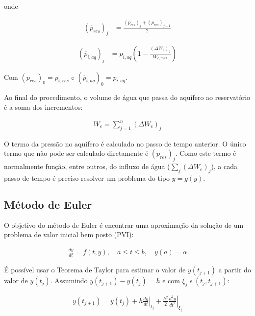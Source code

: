 \documentclass[final,5p]{elsarticle}
\numberwithin{equation}{section}
\begin{document}
        \noindent
        onde

        \begin{align}
            (\overline{p}_{res})_j &= \frac{(p_{res})_j + (p_{res})_{j-1}}{2} \label{eq:presmedio}
        \end{align}

        \begin{align}
            (\overline{p}_{i,aq})_j &= p_{i,aq} \left( 1 - \frac{(\Delta W_e)_j}{W_{e,max}} \right) \label{eq:paqmedio}
        \end{align}

        Com $(p_{res})_0 = p_{i,res}$ e $(\overline{p}_{i,aq})_0 = p_{i,aq}$.

        Ao final do procedimento, o volume de água que passa do aquífero ao reservatório é a soma dos incrementos:

        \begin{align}
            W_e = \sum_{j = 1}^{n}  (\Delta W_e)_j \label{eq:wetotal}
        \end{align}

        O termo da pressão no aquífero é calculado no passo de tempo anterior. O único termo que não pode ser calculado diretamente é $(p_{res})_j$. Como este termo é normalmente função, entre outros, do influxo de água ($\sum_{j} (\Delta W_e)_j$), a cada passo de tempo é preciso resolver um problema do tipo $y = g(y)$.

    \subsection{Método de Euler}

        O objetivo do método de Euler é encontrar uma aproximação da solução de um problema de valor inicial bem posto (PVI):

        \begin{align}
            \frac{dy}{dt} = f(t,y), \quad a \leq t \leq b, \quad y(a) = \alpha \label{eq:pvi}
        \end{align}

        É possível usar o Teorema de Taylor para estimar o valor de $y(t_{j+1})$ a partir do valor de $y(t_j)$. Assumindo $y(t_{j+1}) - y(t_j) = h$ e com $\xi_j \; \epsilon \; (t_j, t_{j+1})$:

        \begin{align}
            y(t_{j+1}) = y(t_j) + h \left. \frac{dy}{dt} \right|_{t_j} + \frac{h^2}{2} \left. \frac{d^2y}{dt^2} \right|_{\xi_j} \label{eq:taylor}
        \end{align}
\end{document}
